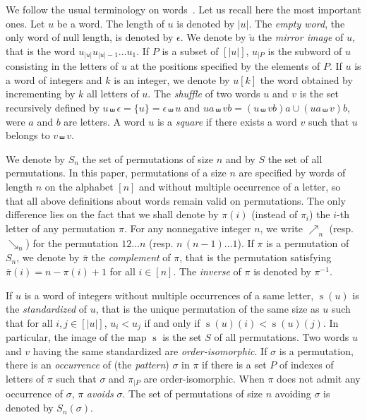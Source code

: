 \documentclass[a4paper]{llncs}
\DeclareMathOperator{\STD}{\mathrm{s}}
\begin{document}
We follow the usual terminology on words~\cite{ChoffrutKarhumaki1997}.
Let us recall here the most important ones. Let $u$ be a word. The
length of $u$ is denoted by $|u|$. The {\em empty word}, the only word
of null length, is denoted by $\epsilon$. We denote by $\widetilde{u}$
the {\em mirror image} of $u$, that is the word
$u_{|u|} u_{|u| - 1} \dots u_1$. If $P$ is a subset of $[|u|]$, $u_{|P}$
is the subword of $u$ consisting in the letters of $u$ at the positions
specified by the elements of $P$. If $u$ is a word of integers and $k$
is an integer, we denote by $u[k]$ the word obtained by incrementing by
$k$ all letters of $u$. The {\em shuffle} of two words $u$ and $v$ is
the set recursively defined by
$u \shuffle \epsilon = \{u\} = \epsilon \shuffle u$ and
$ua \shuffle vb = (u \shuffle vb)a \cup (ua \shuffle v)b$, were $a$ and
$b$ are letters. A word $u$ is a {\em square} if there exists a word $v$
such that $u$ belongs to $v \shuffle v$.

We denote by $S_n$ the set of permutations of size $n$ and by $S$ the
set of all permutations. In this paper, permutations of a size $n$ are
specified by words of length $n$ on the alphabet $[n]$ and without
multiple occurrence of a letter, so that all above definitions about
words remain valid on permutations. The only difference lies on the
fact that we shall denote by $\pi(i)$ (instead of $\pi_i$) the $i$-th
letter of any permutation $\pi$. For any nonnegative integer $n$, we
write $\nearrow_{n}$ (resp. $\searrow_{n}$) for the permutation
$1 2 \dots n$ (resp. $n\,(n-1) \dots 1$). If $\pi$ is a permutation of
$S_n$, we denote by $\bar \pi$ the {\em complement} of $\pi$, that is
the permutation satisfying $\bar \pi(i) = n - \pi(i) + 1$ for all
$i \in [n]$. The {\em inverse} of $\pi$ is denoted by $\pi^{-1}$.

If $u$ is a word of integers without multiple occurrences of a same
letter, $\STD(u)$ is the {\em standardized} of $u$, that is the unique
permutation of the same size as $u$ such that for all $i, j \in [|u|]$,
$u_i < u_j$ if and only if $\STD(u)(i) < \STD(u)(j)$. In particular, the
image of the map $\STD$ is the set $S$ of all permutations. Two words $u$
and $v$ having the same standardized are {\em order-isomorphic}. If
$\sigma$ is a permutation, there is an {\em occurrence} of (the
{\em pattern}) $\sigma$ in $\pi$ if there is a set $P$ of indexes of
letters of $\pi$ such that $\sigma$ and $\pi_{|P}$ are order-isomorphic.
When $\pi$ does not admit any occurrence of $\sigma$, $\pi$ {\em avoids}
$\sigma$. The set of permutations of size $n$ avoiding $\sigma$ is
denoted by $S_n(\sigma)$.
\end{document}
